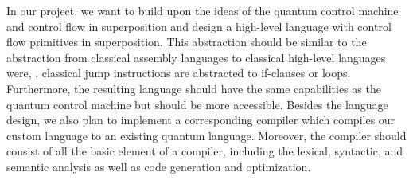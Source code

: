 In our project, we want to build upon the ideas of the quantum control machine and control flow in superposition and design a high-level language with control flow primitives in superposition. This abstraction should be similar to the abstraction from classical assembly languages to classical high-level languages were, \eg, classical jump instructions are abstracted to if-clauses or loops. Furthermore, the resulting language should have the same capabilities as the quantum control machine but should be more accessible.
Besides the language design, we also plan to implement a corresponding compiler which compiles our custom language to an existing quantum language. Moreover, the compiler should consist of all the basic element of a compiler, including the lexical, syntactic, and semantic analysis as well as code generation and optimization.
